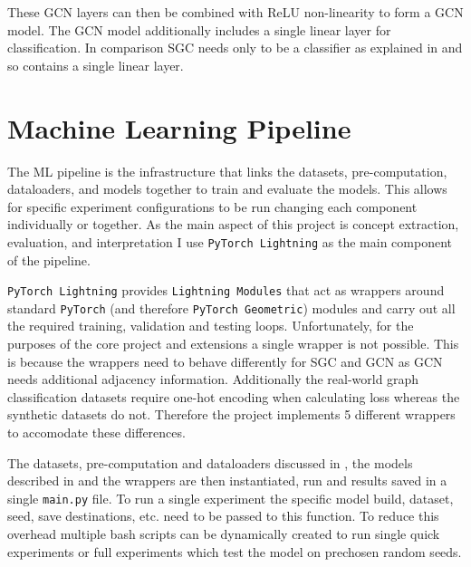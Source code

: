 These GCN layers can then be combined with ReLU non-linearity to form a GCN model.
The GCN model additionally includes a single linear layer for classification.
In comparison SGC needs only to be a classifier as explained in  and so contains a single linear layer.

\section{Machine Learning Pipeline}
\label{sec:pipeline}

The ML pipeline is the infrastructure that links the datasets, pre-computation, dataloaders, and models together to train and evaluate the models.
This allows for specific experiment configurations to be run changing each component individually or together.
As the main aspect of this project is concept extraction, evaluation, and interpretation I use \texttt{PyTorch Lightning} as the main component of the pipeline.

\texttt{PyTorch Lightning} provides \texttt{Lightning Modules} that act as wrappers around standard \texttt{PyTorch} (and therefore \texttt{PyTorch Geometric}) modules and carry out all the required training, validation and testing loops.
Unfortunately, for the purposes of the core project and extensions a single wrapper is not possible.
This is because the wrappers need to behave differently for SGC and GCN as GCN needs additional adjacency information.
Additionally the real-world graph classification datasets require one-hot encoding when calculating loss whereas the synthetic datasets do not.
Therefore the project implements 5 different wrappers to accomodate these differences.

The datasets, pre-computation and dataloaders discussed in , the models described in  and the wrappers are then instantiated, run and results saved in a single \texttt{main.py} file.
To run a single experiment the specific model build, dataset, seed, save destinations, etc. need to be passed to this function.
To reduce this overhead multiple bash scripts can be dynamically created to run single quick experiments or full experiments which test the model on prechosen random seeds.

